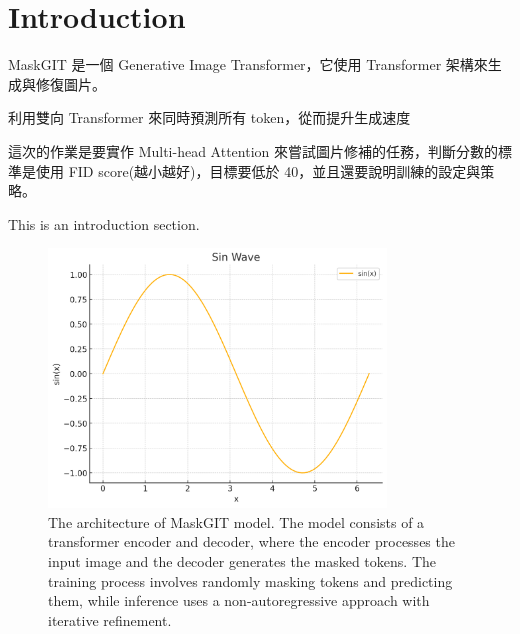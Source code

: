 \section{Introduction}
MaskGIT 是一個 Generative Image Transformer，它使用 Transformer 架構來生成與修復圖片。

利用雙向 Transformer 來同時預測所有 token，從而提升生成速度


這次的作業是要實作 Multi-head Attention 來嘗試圖片修補的任務，判斷分數的標準是使用 FID score(越小越好)，目標要低於 40，並且還要說明訓練的設定與策略。



This is an introduction section. \cite{chang2022maskgit}

\begin{figure}[htbp]
    \centering
    \includegraphics[width=0.8\textwidth]{figures/fig1.png}
    \caption{The architecture of MaskGIT model. The model consists of a transformer encoder and decoder, where the encoder processes the input image and the decoder generates the masked tokens. The training process involves randomly masking tokens and predicting them, while inference uses a non-autoregressive approach with iterative refinement.}
    \label{fig:maskgit_architecture}
\end{figure} 